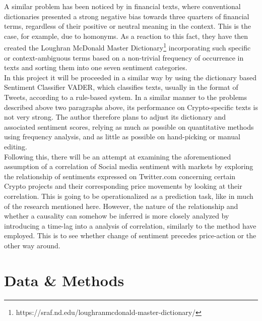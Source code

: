 \documentclass[11pt]{article}
\begin{document}
A similar problem has been noticed by \citet{loughran} in financial texts, where conventional dictionaries presented a strong negative bias towards three quarters of financial terms, regardless of their positive or neutral meaning in the context. This is the case, for example, due to homonyms. As a reaction to this fact, they have then created  the Loughran McDonald Master Dictionary\footnote{https://sraf.nd.edu/loughranmcdonald-master-dictionary/} incorporating such specific or context-ambiguous terms based on a non-trivial frequency of occurrence in texts and sorting them into one seven sentiment categories. \\
In this project it will be proceeded in a similar way by using the dictionary based Sentiment Classifier VADER, which classifies texts, usually in the format of Tweets, according to a rule-based system. In a similar manner to the problems described above two paragraphs above, its performance on Crypto-specific texts is not very strong. The author therefore plans to adjust its dictionary and associated sentiment scores, relying as much as possible on quantitative methods using frequency analysis, and as little as possible on hand-picking or manual editing. \\
Following this, there will be an attempt at examining the aforementioned assumption of a correlation of Social media sentiment with markets by exploring the relationship of sentiments expressed on Twitter.com concerning certain Crypto projects and their corresponding price movements by looking at their correlation. This is going to be operationalized as a prediction task, like in much of the research mentioned here. However, the nature of the relationship and whether a causality can somehow be inferred is more closely analyzed by introducing a time-lag into a analysis of correlation, similarly to the method \citet{matta2015bitcoin} have employed. This is to see whether change of sentiment precedes price-action or the other way around. \\

\section{Data \& Methods}
\end{document}
